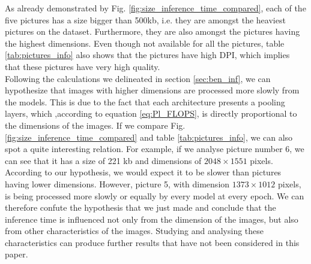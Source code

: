 As already demonstrated by Fig. \ref{fig:size_inference_time_compared}, each of the five pictures has a size bigger than 500kb, i.e. they are amongst the heaviest pictures on the dataset. Furthermore, they are also amongst the pictures having the highest dimensions. Even though not available for all the pictures, table \ref{tab:pictures_info} also shows that the pictures have high DPI, which implies that these pictures have very high quality. \\
Following the calculations we delineated in section \ref{sec:ben_inf}, we can hypothesize that images with higher dimensions are processed more slowly from the models. This is due to the fact that each architecture presents a pooling layers, which ,according to equation \ref{eq:Pl_FLOPS}, is directly proportional to the dimensions of the images. If we compare Fig. \ref{fig:size_inference_time_compared} and table \ref{tab:pictures_info}, we can also spot a quite interesting relation.
For example, if we analyse picture number 6, we can see that it has a size of 221 kb and dimensions of $2048 \times 1551$ pixels. According to our hypothesis, we would expect it to be slower than pictures having lower dimensions. However, picture 5, with dimension $1373 \times 1012$ pixels, is being processed more slowly or equally by every model at every epoch. We can therefore confute the hypothesis that we just made and conclude that the inference time is influenced not only from the dimension of the images, but also from other characteristics of the images. Studying and analysing these characteristics can produce further results that have not been considered in this paper.



